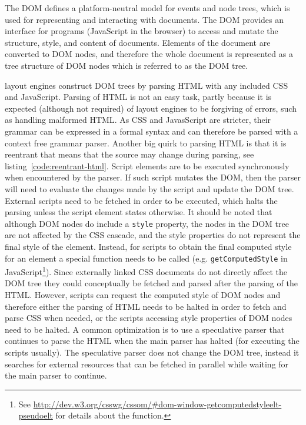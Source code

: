 \documentclass[a4paper,11pt]{kth-mag}
\newcommand{\code}[1]{\texttt{#1}}
\begin{document}
        The \gls{DOM} defines a platform-neutral model for events and node trees, which is used for representing and interacting with \glspl{document}.
        The \gls{DOM} provides an interface for programs (\gls{JavaScript} in the \gls{browser}) to access and mutate the structure, style, and content of \glspl{document}.
        Elements of the \gls{document} are converted to \gls{DOM} nodes, and therefore the whole \gls{document} is represented as a tree structure of \gls{DOM} nodes which is referred to as the \gls{DOM} tree.

        \Glspl{layout engine} construct \gls{DOM} trees by parsing \gls{HTML} with any included \gls{CSS} and \gls{JavaScript}.
        Parsing of \gls{HTML} is not an easy task, partly because it is expected (although not required) of layout engines to be forgiving of errors, such as handling malformed \gls{HTML}.
        As \gls{CSS} and JavasScript are stricter, their grammar can be expressed in a formal syntax and can therefore be parsed with a context free grammar parser.
        Another big quirk to parsing \gls{HTML} is that it is reentrant that means that the source may change during parsing, see listing~\ref{code:reentrant-html}.
        Script \glspl{element} are to be executed synchronously when encountered by the parser.
        If such script mutates the \gls{DOM}, then the parser will need to evaluate the changes made by the script and update the \gls{DOM} tree.
        External scripts need to be fetched in order to be executed, which halts the parsing unless the script \gls{element} states otherwise.
        It should be noted that although \gls{DOM} nodes do include a \code{style} property, the nodes in the \gls{DOM} tree are not affected by the \gls{CSS} cascade, and the style properties do not represent the final style of the \gls{element}.
        Instead, for scripts to obtain the final computed style for an \gls{element} a special function needs to be called (e.g. \code{getComputedStyle} in \gls{JavaScript}\footnote{See \url{http://dev.w3.org/csswg/cssom/\#dom-window-getcomputedstyleelt-pseudoelt} for details about the function.}).
        Since externally linked \gls{CSS} \glspl{document} do not directly affect the \gls{DOM} tree they could conceptually be fetched and parsed after the parsing of the \gls{HTML}.
        However, scripts can request the computed style of \gls{DOM} nodes and therefore either the parsing of \gls{HTML} needs to be halted in order to fetch and parse \gls{CSS} when needed, or the scripts accessing style properties of \gls{DOM} nodes need to be halted.
        A common optimization is to use a speculative parser that continues to parse the \gls{HTML} when the main parser has halted (for executing the scripts usually).
        The speculative parser does not change the \gls{DOM} tree, instead it searches for external resources that can be fetched in parallel while waiting for the main parser to continue.
\end{document}
